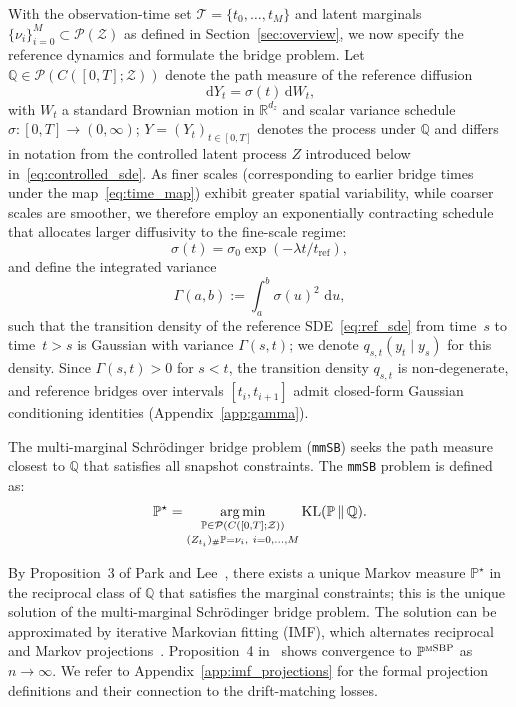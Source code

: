 \documentclass[review,onefignum,onetabnum]{siamart250211}
\newcommand{\R}{\mathbb{R}}
\newcommand{\KL}{\operatorname{KL}}
\newcommand{\argmin}{\operatornamewithlimits{arg\,min}}
\newcommand{\dd}{\,\mathrm{d}}
\newcommand{\1}{\mathbf{1}}
\newcommand{\cZ}{\mathcal{Z}}
\newcommand{\cP}{\mathcal{P}}
\begin{document}
With the observation-time set $\mathcal{T}=\{t_0,\dots,t_M\}$ and latent marginals $\{\nu_i\}_{i=0}^M\subset\cP(\cZ)$ as defined in Section~\ref{sec:overview}, we now specify the reference dynamics and formulate the bridge problem. Let $\mathbb{Q}\in\cP(C([0,T];\cZ))$ denote the path measure of the reference diffusion
\begin{equation}
  \dd Y_t = \sigma(t)\dd W_t,
  \label{eq:ref_sde}
\end{equation}
with $W_t$ a standard Brownian motion in $\R^{d_z}$ and scalar variance schedule $\sigma:[0,T]\to(0,\infty)$; $Y=(Y_t)_{t\in[0,T]}$ denotes the process under $\mathbb{Q}$ and differs in notation from the controlled latent process $Z$ introduced below in~\eqref{eq:controlled_sde}. As finer scales (corresponding to earlier bridge times under the map~\eqref{eq:time_map}) exhibit greater spatial variability, while coarser scales are smoother, we therefore employ an exponentially contracting schedule that allocates larger diffusivity to the fine-scale regime:
\begin{equation}
  \sigma(t)=\sigma_0\exp\!\left(-\lambda t/t_{\mathrm{ref}}\right),
  \label{eq:sigma_exp}
\end{equation}
and define the integrated variance
\begin{equation}
  \Gamma(a,b):=\int_a^b \sigma(u)^2\,\dd u,
  \label{eq:gamma_def}
\end{equation}
such that the transition density of the reference SDE~\eqref{eq:ref_sde} from time~$s$ to time~$t>s$ is Gaussian with variance $\Gamma(s,t)$; we denote $q_{s,t}(y_t\mid y_s)$ for this density. Since $\Gamma(s,t)>0$ for $s<t$, the transition density $q_{s,t}$ is non-degenerate, and reference bridges over intervals $[t_i,t_{i+1}]$ admit closed-form Gaussian conditioning identities (Appendix~\ref{app:gamma}).

The multi-marginal Schrödinger bridge problem (\texttt{mmSB}) seeks the path measure closest to $\mathbb{Q}$ that satisfies all snapshot constraints. The \texttt{mmSB} problem is defined as:
\begin{equation}
\mathbb{P}^\star
=
\argmin_{\substack{\mathbb{P}\in\cP(C([0,T];\cZ))\\[2pt](Z_{t_i})_\#\mathbb{P}=\nu_i,\ i=0,\dots,M}}
\KL(\mathbb{P}\,\|\,\mathbb{Q}).
\label{eq:msbp}
\end{equation}

By Proposition~3 of Park and Lee~\cite{park2025msbm}, there exists a unique Markov measure $\mathbb{P}^\star$ in the reciprocal class of $\mathbb{Q}$ that satisfies the marginal constraints; this is the unique solution of the multi-marginal Schr\"odinger bridge problem. The solution can be approximated by iterative Markovian fitting (IMF), which alternates reciprocal and Markov projections~\cite{park2025msbm}. Proposition~4 in~\cite{park2025msbm} shows convergence to $\mathbb{P}^{\textsc{mSBP}}$ as $n\to\infty$. We refer to Appendix~\ref{app:imf_projections} for the formal projection definitions and their connection to the drift-matching losses.
\end{document}
